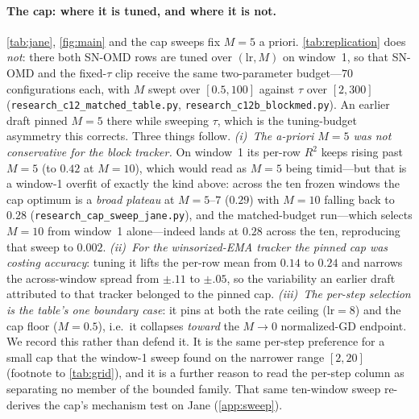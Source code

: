 \documentclass{article}
\begin{document}
\paragraph{The cap: where it is tuned, and where it is not.} \cref{tab:jane},
\cref{fig:main} and the cap sweeps fix $M{=}5$ a priori. \cref{tab:replication} does
\emph{not}: there both SN-OMD rows are tuned over $(\mathrm{lr},M)$ on window~1, so that SN-OMD
and the fixed-$\tau$ clip receive the same two-parameter budget---$70$ configurations each, with
$M$ swept over $[0.5,100]$ against $\tau$ over $[2,300]$
(\texttt{research\_c12\_matched\_table.py}, \texttt{research\_c12b\_blockmed.py}). An earlier
draft pinned $M{=}5$ there while sweeping $\tau$, which is the tuning-budget asymmetry this
corrects. Three things follow. \emph{(i)~The a-priori $M{=}5$ was not conservative for the block
tracker.} On window~1 its per-row $R^2$ keeps rising past $M{=}5$ (to $0.42$ at $M{=}10$), which
would read as $M{=}5$ being timid---but that is a window-1 overfit of exactly the kind above:
across the ten frozen windows the cap optimum is a \emph{broad plateau} at $M{=}5$--$7$ ($0.29$)
with $M{=}10$ falling back to $0.28$ (\texttt{research\_cap\_sweep\_jane.py}), and the
matched-budget run---which selects $M{=}10$ from window~1 alone---indeed lands at $0.28$ across
the ten, reproducing that sweep to $0.002$. \emph{(ii)~For the winsorized-EMA tracker the pinned
cap \emph{was} costing accuracy}: tuning it lifts the per-row mean from $0.14$ to $0.24$ and
narrows the across-window spread from $\pm.11$ to $\pm.05$, so the variability an earlier draft
attributed to that tracker belonged to the pinned cap. \emph{(iii)~The per-step selection is the
table's one boundary case}: it pins at both the rate ceiling ($\mathrm{lr}{=}8$) and the cap
floor ($M{=}0.5$), i.e.\ it collapses \emph{toward} the $M\!\to\!0$ normalized-GD endpoint. We
record this rather than defend it. It is the same per-step preference for a small cap that the
window-1 sweep found on the narrower range $[2,20]$ (footnote to \cref{tab:grid}), and it is a
further reason to read the per-step column as separating no member of the bounded family. That
same ten-window sweep re-derives the cap's mechanism test on Jane (\cref{app:sweep}).
\end{document}
